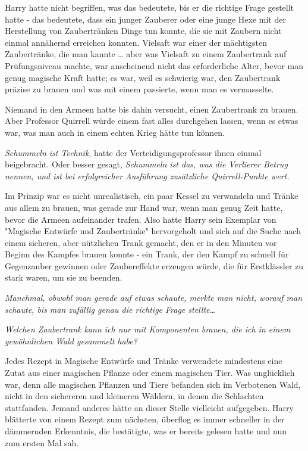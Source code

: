 {Harry hatte nicht begriffen, was das bedeutete, bis er die richtige Frage gestellt hatte - das bedeutete, dass ein junger Zauberer oder eine junge Hexe mit der Herstellung von Zaubertränken Dinge tun konnte, die sie mit Zaubern nicht einmal annähernd erreichen konnten. Vielsaft war einer der mächtigsten Zaubertränke, die man kannte … aber was Vielsaft zu einem Zaubertrank auf Prüfungsniveau machte, war anscheinend nicht das erforderliche Alter, bevor man genug magische Kraft hatte; es war, weil es schwierig war, den Zaubertrank präzise zu brauen und was mit einem passierte, wenn man es vermasselte.

Niemand in den Armeen hatte bis dahin versucht, einen Zaubertrank zu brauen. Aber Professor Quirrell würde einem fast alles durchgehen lassen, wenn es etwas war, was man auch in einem echten Krieg hätte tun können.

\emph{Schummeln ist Technik}, hatte der Verteidigungsprofessor ihnen einmal beigebracht. Oder besser gesagt, \emph{Schummeln ist das, was die Verlierer Betrug nennen, und ist bei erfolgreicher Ausführung zusätzliche Quirrell-Punkte wert.}

Im Prinzip war es nicht unrealistisch, ein paar Kessel zu verwandeln und Tränke aus allem zu brauen, was gerade zur Hand war, wenn man genug Zeit hatte, bevor die Armeen aufeinander trafen. Also hatte Harry sein Exemplar von "Magische Entwürfe und Zaubertränke" hervorgeholt und sich auf die Suche nach einem sicheren, aber nützlichen Trank gemacht, den er in den Minuten vor Beginn des Kampfes brauen konnte - ein Trank, der den Kampf zu schnell für Gegenzauber gewinnen oder Zaubereffekte erzeugen würde, die für Erstklässler zu stark waren, um sie zu beenden.

\emph{Manchmal, obwohl man gerade auf etwas schaute, merkte man nicht, worauf man schaute, bis man zufällig genau die richtige Frage stellte…}

\emph{Welchen Zaubertrank kann ich nur mit Komponenten brauen, die ich in einem gewöhnlichen Wald gesammelt habe?}

Jedes Rezept in Magische Entwürfe und Tränke verwendete mindestens eine Zutat aus einer magischen Pflanze oder einem magischen Tier. Was unglücklich war, denn alle magischen Pflanzen und Tiere befanden sich im Verbotenen Wald, nicht in den sichereren und kleineren Wäldern, in denen die Schlachten stattfanden. Jemand anderes hätte an dieser Stelle vielleicht aufgegeben. Harry blätterte von einem Rezept zum nächsten, überflog es immer schneller in der dämmernden Erkenntnis, die bestätigte, was er bereits gelesen hatte und nun zum ersten Mal sah.

}
